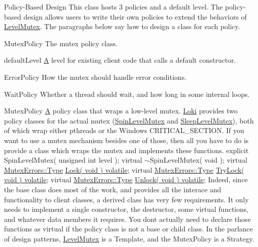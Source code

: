 \begin{DoxyParagraph}{Policy-\/\+Based Design}
This class hosts 3 policies and a default level. The policy-\/based design allows users to write their own policies to extend the behaviors of \hyperlink{classLoki_1_1LevelMutex}{Level\+Mutex}. The paragraphs below say how to design a class for each policy.
\begin{DoxyItemize}
\item Mutex\+Policy The mutex policy class.
\item default\+Level \hyperlink{structA}{A} level for existing client code that calls a default constructor.
\item Error\+Policy How the mutex should handle error conditions.
\item Wait\+Policy Whether a thread should wait, and how long in some internal loops.
\end{DoxyItemize}
\end{DoxyParagraph}
\begin{DoxyParagraph}{Mutex\+Policy}
\hyperlink{structA}{A} policy class that wraps a low-\/level mutex. \hyperlink{namespaceLoki}{Loki} provides two policy classes for the actual mutex (\hyperlink{classLoki_1_1SpinLevelMutex}{Spin\+Level\+Mutex} and \hyperlink{classLoki_1_1SleepLevelMutex}{Sleep\+Level\+Mutex}), both of which wrap either pthreads or the Windows C\+R\+I\+T\+I\+C\+A\+L\+\_\+\+S\+E\+C\+T\+I\+O\+N. If you want to use a mutex mechanism besides one of those, then all you have to do is provide a class which wraps the mutex and implements these functions. explicit Spin\+Level\+Mutex( unsigned int level ); virtual $\sim$\+Spin\+Level\+Mutex( void ); virtual \hyperlink{classLoki_1_1MutexErrors_acd0eb6065ca303083d2e0229d7bff590}{Mutex\+Errors\+::\+Type} \hyperlink{classLoki_1_1LevelMutex_a95d3742db062548201986f482a9c9b9d}{Lock( void ) volatile}; virtual \hyperlink{classLoki_1_1MutexErrors_acd0eb6065ca303083d2e0229d7bff590}{Mutex\+Errors\+::\+Type} \hyperlink{classLoki_1_1LevelMutex_a042a7938dafd6f149cfd7da46478c0c9}{Try\+Lock( void ) volatile}; virtual \hyperlink{classLoki_1_1MutexErrors_acd0eb6065ca303083d2e0229d7bff590}{Mutex\+Errors\+::\+Type} \hyperlink{classLoki_1_1LevelMutex_a553a379257af57ceaef9ed48b0dc8b70}{Unlock( void ) volatile}; Indeed, since the base class does most of the work, and provides all the interace and functionality to client classes, a derived class has very few requirements. It only needs to implement a single constructor, the destructor, some virtual functions, and whatever data members it requires. You don\textquotesingle{}t actually need to declare those functions as virtual if the policy class is not a base or child class. In the parlance of design patterns, \hyperlink{classLoki_1_1LevelMutex}{Level\+Mutex} is a Template, and the Mutex\+Policy is a Strategy.
\end{DoxyParagraph}
